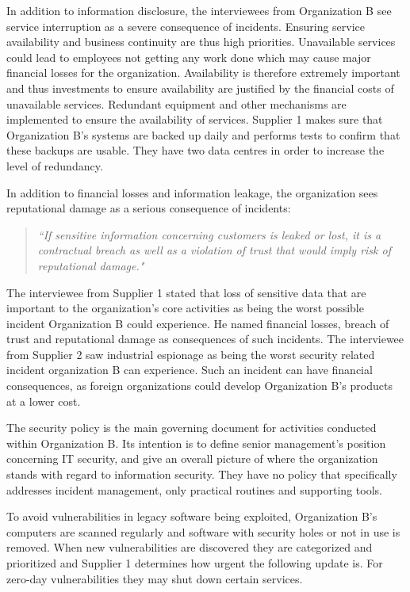 In addition to information disclosure, the interviewees from Organization B see service interruption as a severe consequence of incidents. Ensuring service availability and business continuity are thus high priorities. Unavailable services could lead to employees not getting any work done which may cause major financial losses for the organization. Availability is therefore extremely important and thus investments to ensure availability are justified by the financial costs of unavailable services. Redundant equipment and other mechanisms are implemented to ensure the availability of services. Supplier 1 makes sure that Organization B's systems are backed up daily and performs tests to confirm that these backups are usable. They have two data centres in order to increase the level of redundancy.

In addition to financial losses and information leakage, the organization sees reputational damage as a serious consequence of incidents: 

\begin{quote}
\textit{``If sensitive information concerning customers is leaked or lost, it is a contractual breach as well as a violation of trust that would imply risk of reputational damage."}
\end{quote}

The interviewee from Supplier 1 stated that loss of sensitive data that are important to the organization's core activities as being the worst possible incident Organization B could experience. He named financial losses, breach of trust and reputational damage as consequences of such incidents. The interviewee from Supplier 2 saw industrial espionage as being the worst security related incident organization B can experience. Such an incident can have financial consequences, as foreign organizations could develop Organization B's products at a lower cost. 

The security policy is the main governing document for activities conducted within Organization B. Its intention is to define senior management's position concerning IT security, and give an overall picture of where the organization stands with regard to information security. They have no policy that specifically addresses incident management, only practical routines and supporting tools.

To avoid vulnerabilities in legacy software being exploited, Organization B's computers are scanned regularly and software with security holes or not in use is removed. When new vulnerabilities are discovered they are categorized and prioritized and Supplier 1 determines how urgent the following update is. For zero-day vulnerabilities they may shut down certain services.

